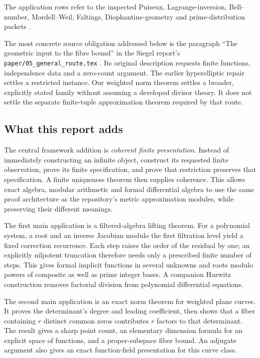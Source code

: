 The application rows refer to the inspected Puiseux, Lagrange-inversion,
Bell-number, Mordell--Weil, Faltings, Diophantine-geometry and prime-distribution
packets \cite{repoPuiseux,repoLagrange,repoBell,repoMW,repoFaltings,repoGeometry,repoPrimes}.

The most concrete source obligation addressed below is the paragraph
``The geometric input to the fibre bound'' in the Siegel report's
\texttt{paper/05\_general\_route.tex} \cite{repoSiegel}. Its original
description requests finite functions, independence data and a zero-count
argument. The earlier hyperelliptic repair settles a restricted instance.
Our weighted norm theorem settles a broader, explicitly stated family
without assuming a developed divisor theory. It does not settle the
separate finite-tuple approximation theorem required by that route.

\subsection{What this report adds}

The central framework addition is \emph{coherent finite presentation}.
Instead of immediately constructing an infinite object, construct its
requested finite observation, prove its finite specification, and prove
that restriction preserves that specification. A finite uniqueness theorem
then supplies coherence. This allows exact algebra, modular arithmetic and
formal differential algebra to use the same proof architecture as the
repository's metric approximation modules, while preserving their different
meanings.

The first main application is a filtered-algebra lifting theorem. For a
polynomial system, a root and an inverse Jacobian modulo the first
filtration level yield a fixed correction recurrence. Each step raises the
order of the residual by one; an explicitly nilpotent truncation therefore
needs only a prescribed finite number of steps. This gives formal implicit
functions in several unknowns and roots modulo powers of composite as well
as prime integer bases. A companion Hurwitz construction removes factorial
division from polynomial differential equations.

The second main application is an exact norm theorem for weighted plane
curves. It proves the determinant's degree and leading coefficient, then
shows that a fiber containing \(r\) distinct common zeros contributes
\(r\) factors to that determinant. The result gives a sharp point count,
an elementary dimension formula for an explicit space of functions, and a
proper-subspace fiber bound. An adjugate argument also gives an exact
function-field presentation for this curve class.


